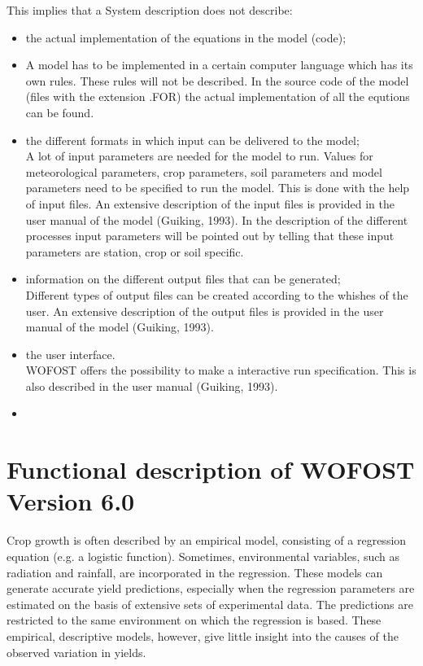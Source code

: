 This implies that a System description does not describe:
\begin{itemize}
\item the actual implementation of the equations in the model (code);
\item A model has to be implemented in a certain computer language which has its
own rules. These rules will not be described. In the source code of the model 
(files with the extension .FOR) the actual implementation of all the equtions
can be found.
\item the different formats in which input can be delivered to the model;\\
A lot of input parameters are needed for the model to run. Values for
meteorological parameters, crop parameters, soil parameters and model
parameters need to be specified to run the model. This is done with the help
of input files. An extensive description of the input files is provided in the user
manual of the model (Guiking, 1993). In the description of the different
processes input parameters will be pointed out by telling that these input
parameters are station, crop or soil specific.   
\item information on the different output files that can be generated;\\
Different types of output files can be created according to the whishes of the
user. An extensive description of the output files is provided in the user
manual of the model (Guiking, 1993).
\item the user interface. \\
WOFOST offers the possibility to make a interactive run specification. This is
also described in the user manual (Guiking, 1993).

\item 
\end{itemize}

\section{Functional description of WOFOST Version 6.0}

Crop growth is often described by an empirical model, consisting of a regression
equation (e.g. a logistic function). Sometimes, environmental variables, such as
radiation and rainfall, are incorporated in the regression. These models can generate
accurate yield predictions, especially when the regression parameters are estimated on
the basis of extensive sets of experimental data. The predictions are restricted to the
same environment on which the regression is based. These empirical, descriptive
models, however, give little insight into the causes of the observed variation in yields. 

